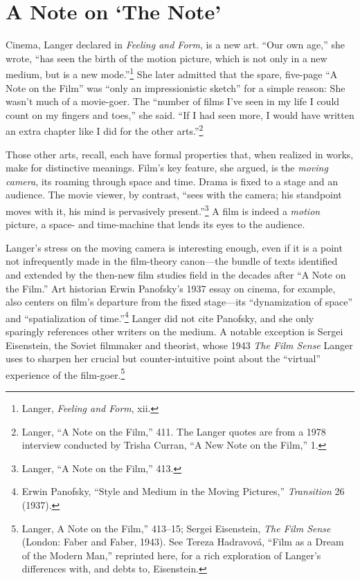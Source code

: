 \documentclass{tufte-handout}
\begin{document}
\hypertarget{a-note-on-the-note}{%
\section{A Note on `The Note'}\label{a-note-on-the-note}}

Cinema, Langer declared in \emph{Feeling and Form}, is a new art. ``Our
own age,'' she wrote, ``has seen the birth of the motion picture, which
is not only in a new medium, but is a new mode.''\footnote{Langer,
  \emph{Feeling and Form}, xii.} She later admitted that the spare,
five-page ``A Note on the Film'' was ``only an impressionistic sketch''
for a simple reason: She wasn't much of a movie-goer. The ``number of
films I've seen in my life I could count on my fingers and toes,'' she
said. ``If I had seen more, I would have written an extra chapter like I
did for the other arts.''\footnote{Langer, ``A Note on the Film,'' 411.
  The Langer quotes are from a 1978 interview conducted by Trisha
  Curran, ``A New Note on the Film,'' 1.}

Those other arts, recall, each have formal properties that, when
realized in works, make for distinctive meanings. Film's key feature,
she argued, is the \emph{moving camera}, its roaming through space and
time. Drama is fixed to a stage and an audience. The movie viewer, by
contrast, ``sees with the camera; his standpoint moves with it, his mind
is pervasively present.''\footnote{Langer, ``A Note on the Film,''
  413.} A film is indeed a \emph{motion} picture, a space- and
time-machine that lends its eyes to the audience.

Langer's stress on the moving camera is interesting enough, even if it
is a point not infrequently made in the film-theory canon---the bundle
of texts identified and extended by the then-new film studies field in
the decades after ``A Note on the Film.'' Art historian Erwin Panofsky's
1937 essay on cinema, for example, also centers on film's departure from
the fixed stage---its ``dynamization of space'' and ``spatialization of
time.''\footnote{Erwin Panofsky, ``Style and Medium in the Moving
  Pictures,'' \emph{Transition} 26 (1937).} Langer did not cite
Panofsky, and she only sparingly references other writers on the medium.
A notable exception is Sergei Eisenstein, the Soviet filmmaker and
theorist, whose 1943 \emph{The Film Sense} Langer uses to sharpen her
crucial but counter-intuitive point about the ``virtual'' experience of
the film-goer.\footnote{Langer, A Note on the Film,'' 413--15;
  Sergei Eisenstein, \emph{The Film Sense} (London: Faber and Faber,
  1943). See Tereza Hadravová, ``Film as a Dream of the Modern
  Man,'' reprinted here, for a rich exploration of Langer's differences
  with, and debts to, Eisenstein.}
\end{document}
